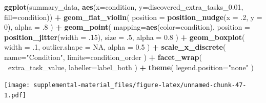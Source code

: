 \documentclass[]{book}
\newenvironment{Shaded}{\begin{snugshade}}{\end{snugshade}}
\newcommand{\DataTypeTok}[1]{\textcolor[rgb]{0.13,0.29,0.53}{#1}}
\newcommand{\DecValTok}[1]{\textcolor[rgb]{0.00,0.00,0.81}{#1}}
\newcommand{\FloatTok}[1]{\textcolor[rgb]{0.00,0.00,0.81}{#1}}
\newcommand{\KeywordTok}[1]{\textcolor[rgb]{0.13,0.29,0.53}{\textbf{#1}}}
\newcommand{\NormalTok}[1]{#1}
\newcommand{\OperatorTok}[1]{\textcolor[rgb]{0.81,0.36,0.00}{\textbf{#1}}}
\newcommand{\OtherTok}[1]{\textcolor[rgb]{0.56,0.35,0.01}{#1}}
\newcommand{\StringTok}[1]{\textcolor[rgb]{0.31,0.60,0.02}{#1}}
\begin{document}
\begin{Shaded}
\begin{Highlighting}[]
\KeywordTok{ggplot}\NormalTok{(summary_data, }\KeywordTok{aes}\NormalTok{(}\DataTypeTok{x=}\NormalTok{condition, }\DataTypeTok{y=}\NormalTok{discovered_extra_tasks_}\FloatTok{0.01}\NormalTok{, }\DataTypeTok{fill=}\NormalTok{condition)) }\OperatorTok{+}
\StringTok{  }\KeywordTok{geom_flat_violin}\NormalTok{(}
    \DataTypeTok{position =} \KeywordTok{position_nudge}\NormalTok{(}\DataTypeTok{x =} \FloatTok{.2}\NormalTok{, }\DataTypeTok{y =} \DecValTok{0}\NormalTok{),}
    \DataTypeTok{alpha =} \FloatTok{.8}
\NormalTok{  ) }\OperatorTok{+}
\StringTok{  }\KeywordTok{geom_point}\NormalTok{(}
    \DataTypeTok{mapping=}\KeywordTok{aes}\NormalTok{(}\DataTypeTok{color=}\NormalTok{condition),}
    \DataTypeTok{position =} \KeywordTok{position_jitter}\NormalTok{(}\DataTypeTok{width =} \FloatTok{.15}\NormalTok{),}
    \DataTypeTok{size =} \FloatTok{.5}\NormalTok{,}
    \DataTypeTok{alpha =} \FloatTok{0.8}
\NormalTok{  ) }\OperatorTok{+}
\StringTok{  }\KeywordTok{geom_boxplot}\NormalTok{(}
    \DataTypeTok{width =} \FloatTok{.1}\NormalTok{,}
    \DataTypeTok{outlier.shape =} \OtherTok{NA}\NormalTok{,}
    \DataTypeTok{alpha =} \FloatTok{0.5}
\NormalTok{  ) }\OperatorTok{+}
\StringTok{  }\KeywordTok{scale_x_discrete}\NormalTok{(}
    \DataTypeTok{name=}\StringTok{"Condition"}\NormalTok{,}
    \DataTypeTok{limits=}\NormalTok{condition_order}
\NormalTok{  ) }\OperatorTok{+}
\StringTok{  }\KeywordTok{facet_wrap}\NormalTok{(}
    \OperatorTok{~}\NormalTok{extra_task_value,}
    \DataTypeTok{labeller=}\NormalTok{label_both}
\NormalTok{  ) }\OperatorTok{+}
\StringTok{  }\KeywordTok{theme}\NormalTok{(}
    \DataTypeTok{legend.position=}\StringTok{"none"}
\NormalTok{  )}
\end{Highlighting}
\end{Shaded}

\texttt{[image: supplemental-material\_files/figure-latex/unnamed-chunk-47-1.pdf]}

\begin{Shaded}
\end{Shaded}
\end{document}
